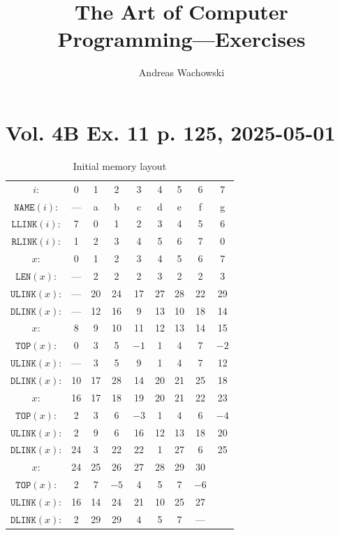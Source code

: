 \documentclass[a4paper,landscape,11pt]{article}
\title{The Art of Computer Programming---Exercises}
\author{Andreas Wachowski}
\date{}
\begin{document}
\maketitle

\thispagestyle{empty}
\tableofcontents
\listoffigures
\listoftables
\newpage
{}

\section{Vol. 4B Ex. 11 p. 125, 2025-05-01}

\begin{table}
	\begin{center}
		\caption{Initial memory layout}
		\begin{tabular}{c c c c c c c c c }
			\hline
			$i$:                 & 0   & 1  & 2    & 3    & 4  & 5  & 6    & 7    \\
			$\texttt{NAME}(i)$:  & --- & a  & b    & c    & d  & e  & f    & g    \\
			$\texttt{LLINK}(i)$: & 7   & 0  & 1    & 2    & 3  & 4  & 5    & 6    \\
			$\texttt{RLINK}(i)$: & 1   & 2  & 3    & 4    & 5  & 6  & 7    & 0    \\
			\hline
			$x$:                 & 0   & 1  & 2    & 3    & 4  & 5  & 6    & 7    \\
			$\texttt{LEN}(x)$:   & --- & 2  & 2    & 2    & 3  & 2  & 2    & 3    \\
			$\texttt{ULINK}(x)$: & --- & 20 & 24   & 17   & 27 & 28 & 22   & 29   \\
			$\texttt{DLINK}(x)$: & --- & 12 & 16   & 9    & 13 & 10 & 18   & 14   \\
			\hline
			$x$:                 & 8   & 9  & 10   & 11   & 12 & 13 & 14   & 15   \\
			$\texttt{TOP}(x)$:   & 0   & 3  & 5    & $-1$ & 1  & 4  & 7    & $-2$ \\
			$\texttt{ULINK}(x)$: & --- & 3  & 5    & 9    & 1  & 4  & 7    & 12   \\
			$\texttt{DLINK}(x)$: & 10  & 17 & 28   & 14   & 20 & 21 & 25   & 18   \\
			\hline
			$x$:                 & 16  & 17 & 18   & 19   & 20 & 21 & 22   & 23   \\
			$\texttt{TOP}(x)$:   & 2   & 3  & 6    & $-3$ & 1  & 4  & 6    & $-4$ \\
			$\texttt{ULINK}(x)$: & 2   & 9  & 6    & 16   & 12 & 13 & 18   & 20   \\
			$\texttt{DLINK}(x)$: & 24  & 3  & 22   & 22   & 1  & 27 & 6    & 25   \\
			\hline
			$x$:                 & 24  & 25 & 26   & 27   & 28 & 29 & 30   &      \\
			$\texttt{TOP}(x)$:   & 2   & 7  & $-5$ & 4    & 5  & 7  & $-6$ &      \\
			$\texttt{ULINK}(x)$: & 16  & 14 & 24   & 21   & 10 & 25 & 27   &      \\
			$\texttt{DLINK}(x)$: & 2   & 29 & 29   & 4    & 5  & 7  & ---  &      \\
		\end{tabular}
	\end{center}
\end{table}
\end{document}
